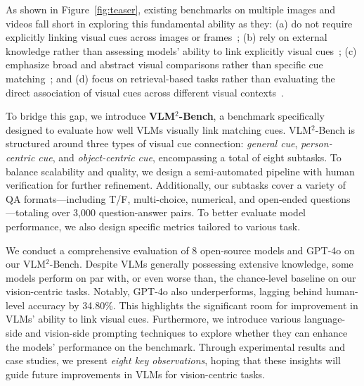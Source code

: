 As shown in Figure~\ref{fig:teaser}, existing benchmarks on multiple images and videos
fall short in exploring this fundamental ability as they: (a) do not require explicitly linking visual cues across images or frames~\citep{liu2024mmdu, yu2019activitynet}; (b) rely on external knowledge rather than assessing models' ability to link explicitly visual cues~\citep{MIRB, liu2024mibench}; (c) emphasize broad and abstract visual comparisons rather than specific cue matching~\citep{MICBench, liu2024tempcompass}; and (d) focus on retrieval-based tasks rather than evaluating the direct association of visual cues across different visual contexts~\citep{wang2024muirbench}.



To bridge this gap, we introduce \textbf{VLM$^2$-Bench}, a benchmark specifically designed to evaluate how well VLMs visually link matching cues. VLM$^2$-Bench is structured around three types of visual cue connection: \textit{general cue}, \textit{person-centric cue}, and \textit{object-centric cue}, encompassing a total of eight subtasks. To balance scalability and quality, we design a semi-automated pipeline with human verification for further refinement. Additionally, our subtasks cover a variety of QA formats—including T/F, multi-choice, numerical, and open-ended questions—totaling over 3,000 question-answer pairs. To better evaluate model performance, we also design specific metrics tailored to various task.

We conduct a comprehensive evaluation of 8 open-source models and GPT-4o on our VLM$^2$-Bench. Despite VLMs generally possessing extensive knowledge, some models perform on par with, or even worse than, the chance-level baseline on our vision-centric tasks. Notably, GPT-4o also underperforms, lagging behind human-level accuracy by 34.80\%. This highlights the significant room for improvement in VLMs' ability to link visual cues. Furthermore, we introduce various language-side and vision-side prompting techniques to explore whether they can enhance the models' performance on the benchmark. Through experimental results and case studies, we present \textit{eight key observations}, hoping that these insights will guide future improvements in VLMs for vision-centric tasks.

